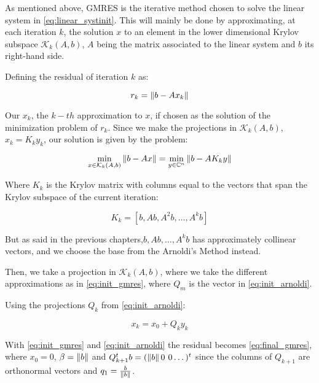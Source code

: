 
As mentioned above, GMRES is the iterative method chosen to solve the linear system in \ref{eq:linear_systinit}. This will mainly be done by approximating, at each iteration $k$, the solution $x$ to an element in the lower dimensional Krylov subspace $\mathcal{K}_{k}(A,b)$, $A$ being the matrix associated to the linear system and $b$ its right-hand side.

Defining the residual of iteration $k$ as:

\begin{equation}
    r_{k} = \left\lVert b - Ax_{k}\right\rVert
\end{equation}

Our $x_{k}$, the $k-th$ approximation to $x$, if chosen as the solution of the minimization problem of $r_{k}$. Since we make the projections in $\mathcal{K}_{k}(A,b)$, $x_{k} = K_{k}y_{k}$, our solution is given by the problem:

\begin{equation}
    \min_{x \in \mathcal{K}_{k}(A,b)} \left\lVert b - Ax\right\rVert = \min_{y \in \mathbb{C}^{n}} \left\lVert b - AK_{k}y\right\rVert
\end{equation}

Where $K_{k}$ is the Krylov matrix with columns equal to the vectors that span the Krylov subspace of the current iteration:

\begin{equation}
    K_{k} = \left[b, Ab, A^{2}b, \dots, A^{k}b \right]
\end{equation}

But as said in the previous chapters,${b,Ab, \dots, A^{k}b}$ has approximately collinear vectors, and we choose the base from the Arnoldi's Method instead.

Then, we take a projection in $\mathcal{K}_{k}(A,b)$, where we take the different approximations as in \ref{eq:init_gmres}, where $Q_{m}$ is the vector in \ref{eq:init_arnoldi}.

Using the projections $Q_{k}$ from \ref{eq:init_arnoldi}:

\begin{equation}\label{eq:init_gmres}
    x_{k} = x_{0} + Q_{k}y_{k}
\end{equation}

With \ref{eq:init_gmres} and \ref{eq:init_arnoldi} the residual becomes \ref{eq:final_gmres}, where $x_{0} = 0$, $\beta=\left\lVert b\right\rVert$ and $Q_{k+1}^{t}b=(\left\lVert b\right\rVert 0 \hspace{0.05in} 0\dots)^{t}$ since the columns of $Q_{k+1}$ are orthonormal vectors and $q_{1} = \frac{b}{\left\lVert b\right\rVert}$.

